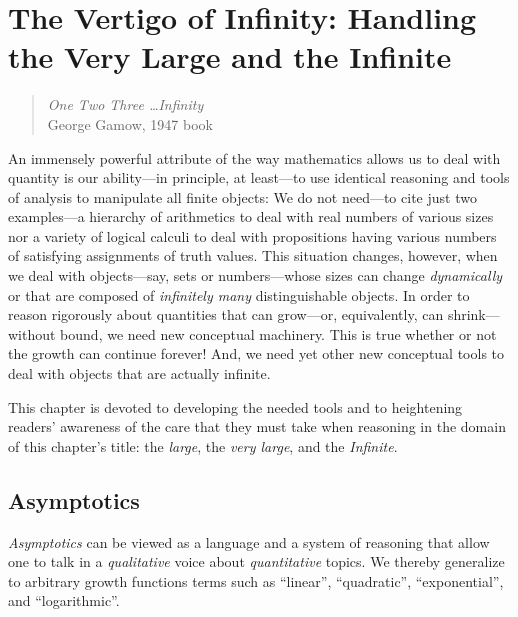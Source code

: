 
\chapter{The Vertigo of Infinity:
Handling the Very Large and the Infinite}
\label{ch:infinity}

\begin{quote}
{\em One Two Three \ldots Infinity} \\
\hspace*{1in}George Gamow, 1947 book
\end{quote}

\medskip

\noindent
An immensely powerful attribute of the way mathematics allows us to deal with quantity is our ability---in principle, at least---to use identical reasoning and tools of analysis to manipulate all finite objects: We do not need---to cite just two examples---a hierarchy of arithmetics to deal with real numbers of various sizes nor a variety of logical calculi to deal with propositions having various numbers of satisfying assignments of truth values.  This situation changes, however, when we deal with objects---say, sets or numbers---whose sizes can change {\em dynamically} or that are composed of {\em infinitely many} distinguishable objects.  In order to reason rigorously about quantities that can grow---or, equivalently, can shrink---without bound, we need new conceptual machinery.  This is true whether or not the growth can continue forever!  And, we need yet other new conceptual tools to deal with objects that are actually infinite.

\smallskip

This chapter is devoted to developing the needed tools and to heightening readers' awareness of the care that they must take when reasoning in the domain of this chapter's title: the {\em large}, the {\em very large}, and the {\em Infinite}.

\section{Asymptotics}
\label{sec:asymptotics}

{\em Asymptotics} can be viewed as a language and a system of reasoning that allow one to talk in a {\em qualitative} voice about {\em quantitative} topics.  We thereby generalize to arbitrary growth functions terms such as ``linear'', ``quadratic'', ``exponential'', and ``logarithmic''.

